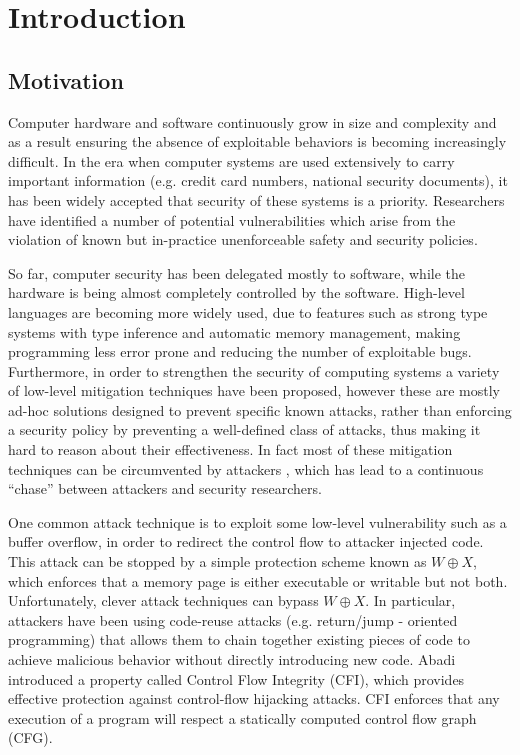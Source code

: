 \chapter{Introduction}\label{ch:introduction}

\section{Motivation}\label{sec:motivation}

Computer hardware and software continuously grow in size and complexity and as a
result ensuring the absence of exploitable behaviors is becoming increasingly 
difficult. In the era when computer systems are used extensively to
carry important information (e.g. credit card numbers, national security
documents), it has been widely accepted that security of these systems is a
priority. Researchers have identified a number of potential vulnerabilities
which arise from the violation of known but in-practice unenforceable safety
and security policies.
 
So far, computer security has been delegated mostly to software, while
the hardware is being almost completely controlled by the software.
High-level languages are becoming more widely used, due to features
such as strong type systems with type inference and automatic memory
management, making programming less error prone and reducing the
number of exploitable bugs. Furthermore, in order to strengthen the
security of computing systems a variety of low-level mitigation
techniques \cite{Cowan:1998:SAA:1267549.1267554,PaX,
  Erlingsson:2007:LSS:1793914.1793919}
have been proposed, however these are mostly ad-hoc solutions designed
to prevent specific known attacks, rather than enforcing a security
policy by preventing a well-defined class of attacks, thus making it
hard to reason about their effectiveness. In fact most of these
mitigation techniques can be circumvented by attackers
\cite{Szekeres2013}, which has lead to a continuous ``chase'' between
attackers and security researchers.

One common attack technique is to exploit some low-level vulnerability
such as a buffer overflow, in order to redirect the control flow to
attacker injected code. This attack can be stopped by a simple
protection scheme known as $W \oplus X$, which enforces that a memory
page is either executable or writable but not both.  Unfortunately,
clever attack techniques can bypass $W \oplus X$. In particular,
attackers have been using code-reuse attacks (e.g. return/jump -
oriented programming) that allows them to chain together existing
pieces of code to achieve malicious behavior without directly
introducing new code.  Abadi~\ETAL\cite{abadi2005} introduced a
property called Control Flow Integrity (CFI), which provides effective
protection against control-flow hijacking attacks.  CFI enforces that
any execution of a program will respect a statically computed control
flow graph (CFG).  

